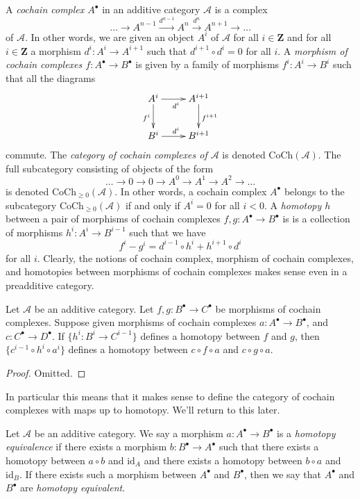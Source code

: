 \noindent
A {\it cochain complex $A^\bullet$} in an additive category $\mathcal{A}$
is a complex
$$
\ldots \to
A^{n - 1} \xrightarrow{d^{n - 1}}
A^n \xrightarrow{d^n}
A^{n + 1} \to
\ldots
$$
of $\mathcal{A}$. In other words, we are given an object $A^i$ of
$\mathcal{A}$ for all $i \in \mathbf{Z}$ and for
all $i \in \mathbf{Z}$ a morphism $d^i : A^i \to A^{i + 1}$ such that
$d^{i + 1} \circ d^i = 0$ for all $i$. A {\it morphism of cochain
complexes $f : A^\bullet \to B^\bullet$} is given by a
family of morphisms $f^i : A^i \to B^i$ such that all
the diagrams
$$
\xymatrix{
A^i \ar[r]_{d^i} \ar[d]_{f^i} & A^{i + 1} \ar[d]^{f^{i + 1}} \\
B^i \ar[r]^{d^i} & B^{i + 1}
}
$$
commute. The {\it category of cochain complexes of $\mathcal{A}$}
is denoted $\text{CoCh}(\mathcal{A})$. The full subcategory consisting
of objects of the form
$$
\ldots \to 0 \to 0 \to A^0 \to A^1 \to A^2 \to \ldots
$$
is denoted $\text{CoCh}_{\geq 0}(\mathcal{A})$.
In other words, a cochain complex $A^\bullet$ belongs to the subcategory
$\text{CoCh}_{\geq 0}(\mathcal{A})$ if and only if
$A^i = 0$ for all $i < 0$.
A {\it homotopy $h$} between a pair of morphisms
of cochain complexes $f, g : A^\bullet \to B^\bullet$ is
is a collection of morphisms $h^i : A^i \to B^{i - 1}$
such that we have
$$
f^i - g^i = d^{i - 1} \circ h^i + h^{i + 1} \circ d^i
$$
for all $i$. Clearly, the notions of cochain complex, morphism of
cochain complexes, and homotopies between morphisms of cochain complexes
makes sense even in a preadditive category.

\begin{lemma}
\label{lemma-compose-homotopy-cochain}
Let $\mathcal{A}$ be an additive category.
Let $f, g : B^\bullet \to C^\bullet$ be morphisms
of cochain complexes. Suppose given morphisms of cochain
complexes $a : A^\bullet \to B^\bullet$, and
$c : C^\bullet \to D^\bullet$.
If $\{h^i : B^i \to C^{i - 1}\}$ defines a homotopy
between $f$ and $g$, then $\{c^{i - 1} \circ h^i \circ a^i\}$
defines a homotopy between $c \circ f \circ a$ and
$c \circ g \circ a$.
\end{lemma}

\begin{proof}
Omitted.
\end{proof}

\noindent
In particular this means that it makes sense to define
the category of cochain complexes with maps up to homotopy.
We'll return to this later.

\begin{definition}
\label{definition-homotopy-equivalent-cochain}
Let $\mathcal{A}$ be an additive category.
We say a morphism $a : A^\bullet \to B^\bullet$
is a {\it homotopy equivalence} if there exists
a morphism $b : B^\bullet \to A^\bullet$
such that there exists a homotopy between
$a \circ b$ and $\text{id}_A$
and there exists a homotopy between $b \circ a$ and $\text{id}_B$.
If there exists such a morphism between $A^\bullet$ and $B^\bullet$, then
we say that $A^\bullet$ and $B^\bullet$ are {\it homotopy equivalent}.
\end{definition}

